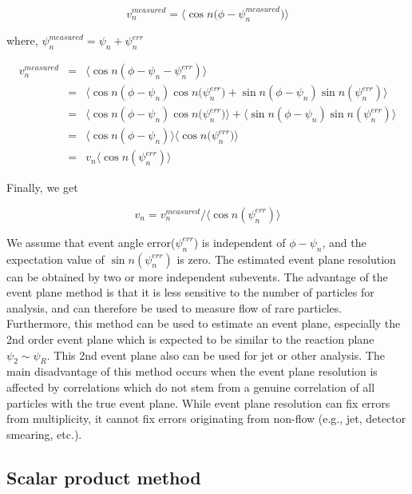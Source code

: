 \begin{equation}
v_n^{measured}=\langle\cos{n({\phi-\psi_n^{measured})}}\rangle
\end{equation}
\smallskip

where, $\psi_n^{measured} = \psi_n + \psi_n^{err}$

\begin{eqnarray}
v_n^{measured}&=&\langle\cos{n(\phi-\psi_n-\psi_n^{err})}\rangle \\
&=&\langle\cos{n(\phi-\psi_n)}\cos{n(\psi_n^{err}})+\sin{n(\phi-\psi_n)}\sin{n(\psi_n^{err})}\rangle \\
&=&\langle\cos{n(\phi-\psi_n)}\cos{n(\psi_n^{err}})\rangle+\langle\sin{n(\phi-\psi_n)}\sin{n(\psi_n^{err})}\rangle \\
&=&\langle\cos{n(\phi-\psi_n)}\rangle\langle\cos{n(\psi_n^{err}})\rangle \\
&=&v_n\langle\cos{n(\psi_n^{err})}\rangle
\end{eqnarray}

Finally, we get 

\begin {equation}
v_n = v_n^{measured}/\langle\cos{n(\psi_n^{err})}\rangle
\end {equation}
\smallskip


We assume that event angle error($\psi_n^{err}$) is independent of $\phi-\psi_n$, and the expectation value of $\sin{n(\psi_n^{err})}$ is zero. The estimated event plane resolution can be obtained by two or more independent subevents.\cite{PhysRevC.58.1671} The advantage of the event plane method is that it is less sensitive to the number of particles for analysis, and can therefore be used to measure flow of rare particles. Furthermore, this method can be used to estimate an event plane, especially the 2nd order event plane which is expected to be similar to the reaction plane $\psi_2 \sim \psi_R$. This 2nd event plane also can be used for jet or other analysis. The main disadvantage of this method occurs when the event plane resolution is affected by correlations which do not stem from a genuine correlation of all particles with the true event plane. While event plane resolution can fix errors from multiplicity, it cannot fix errors originating from non-flow (e.g., jet, detector smearing, etc.). 

\subsection{Scalar product method}

